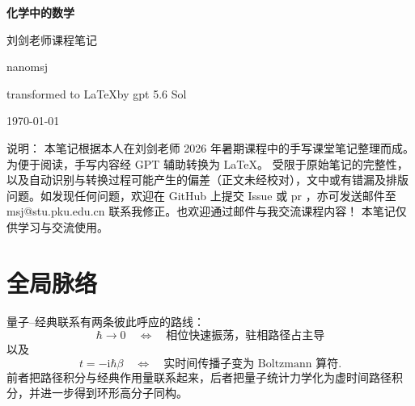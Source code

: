 \documentclass[11pt,a4paper,oneside,openany,fontset=fandol]{ctexbook}
\newcommand{\ii}{\mathrm{i}}
\begin{document}
\begin{titlepage}
\centering
\vspace*{4.5cm}
{\Huge\bfseries 化学中的数学\par}
\vspace{1cm}
{\large 刘剑老师课程笔记 \par}
\vspace{0.5cm}
{\large nanomsj \par}
\vspace{0.5cm}
{\large transformed to \LaTeX by gpt 5.6 Sol\par}
\vspace{1.5cm}
{\normalsize \today\par}
\vfill

\end{titlepage}

\frontmatter
\tableofcontents
\vfill
说明：
本笔记根据本人在刘剑老师 2026 年暑期课程中的手写课堂笔记整理而成。为便于阅读，手写内容经 GPT 辅助转换为 LaTeX。
受限于原始笔记的完整性，以及自动识别与转换过程可能产生的偏差（正文未经校对），文中或有错漏及排版问题。如发现任何问题，欢迎在 GitHub 上提交 Issue 或 pr ，亦可发送邮件至 msj@stu.pku.edu.cn 联系我修正。也欢迎通过邮件与我交流课程内容！
本笔记仅供学习与交流使用。
\mainmatter


\chapter{全局脉络}

\begin{routebox}
量子--经典联系有两条彼此呼应的路线：
\[
\hbar\to 0
\quad\Longleftrightarrow\quad
\text{相位快速振荡，驻相路径占主导}
\]
以及
\[
t=-\ii\hbar\beta
\quad\Longleftrightarrow\quad
\text{实时间传播子变为 Boltzmann 算符}.
\]
前者把路径积分与经典作用量联系起来，后者把量子统计力学化为虚时间路径积分，并进一步得到环形高分子同构。
\end{routebox}
\end{document}
